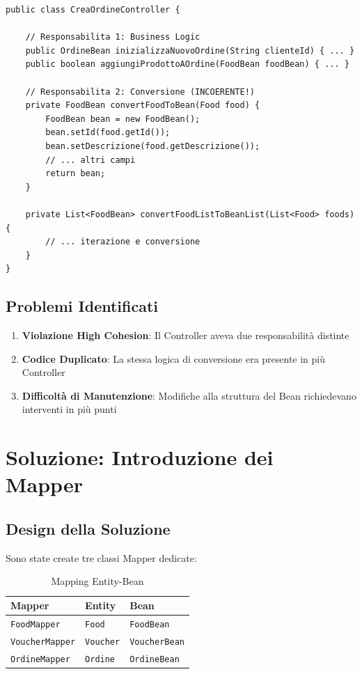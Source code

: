 \documentclass[12pt,a4paper]{article}
\begin{document}
\begin{lstlisting}[style=javastyle, caption={Conversione nel Controller (PRIMA)}]
public class CreaOrdineController {
    
    // Responsabilita 1: Business Logic
    public OrdineBean inizializzaNuovoOrdine(String clienteId) { ... }
    public boolean aggiungiProdottoAOrdine(FoodBean foodBean) { ... }
    
    // Responsabilita 2: Conversione (INCOERENTE!)
    private FoodBean convertFoodToBean(Food food) {
        FoodBean bean = new FoodBean();
        bean.setId(food.getId());
        bean.setDescrizione(food.getDescrizione());
        // ... altri campi
        return bean;
    }
    
    private List<FoodBean> convertFoodListToBeanList(List<Food> foods) {
        // ... iterazione e conversione
    }
}
\end{lstlisting}

\subsection{Problemi Identificati}

\begin{enumerate}
    \item \textbf{Violazione High Cohesion}: Il Controller aveva due responsabilità distinte
    \item \textbf{Codice Duplicato}: La stessa logica di conversione era presente in più Controller
    \item \textbf{Difficoltà di Manutenzione}: Modifiche alla struttura del Bean richiedevano interventi in più punti
\end{enumerate}

\section{Soluzione: Introduzione dei Mapper}

\subsection{Design della Soluzione}

Sono state create tre classi Mapper dedicate:

\begin{table}[h]
\centering
\begin{tabular}{|l|l|l|}
\hline
\textbf{Mapper} & \textbf{Entity} & \textbf{Bean} \\
\hline
\texttt{FoodMapper} & \texttt{Food} & \texttt{FoodBean} \\
\texttt{VoucherMapper} & \texttt{Voucher} & \texttt{VoucherBean} \\
\texttt{OrdineMapper} & \texttt{Ordine} & \texttt{OrdineBean} \\
\hline
\end{tabular}
\caption{Mapping Entity-Bean}
\end{table}
\end{document}

